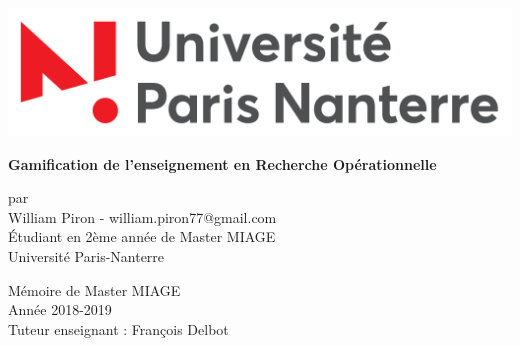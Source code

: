 \begin{titlepage}
\begin{center}
\includegraphics[width=0.7\linewidth]{Images/Logo_Universite_Paris-Nanterre.png}
\end{center}
\vspace{2cm}
    \begin{center}
        \vspace*{1cm}
        
        {\LARGE \textbf{Gamification de l'enseignement en Recherche Opérationnelle}}
        
        \vspace{0.5cm}
        
        \vspace{1.5cm}
        par \\
        \vspace{1.5cm}
       William Piron - william.piron77@gmail.com \\
       Étudiant en 2ème année de Master MIAGE \\
       Université Paris-Nanterre
                
        \vspace{1.0cm}
    \end{center}

\vfill
\textcolor[rgb]{0.5,0.5,0.5}{
    \begin{flushleft}
    { \small
    Mémoire de Master MIAGE \\
    Année 2018-2019 \\
    Tuteur enseignant : François Delbot \\
    }
    \end{flushleft}
}
      
\end{titlepage}
